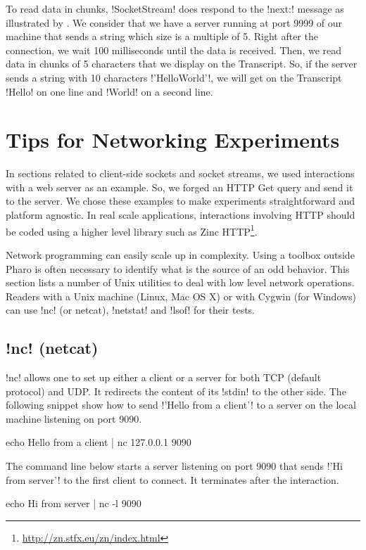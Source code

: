 \documentclass[a4paper,10pt,twoside]{book}
\begin{document}
To read data in chunks, \ct!SocketStream! does respond to the \ct!next:! message as illustrated by .
We consider that we have a server running at port 9999 of our machine that sends a string which size is a multiple of 5.
Right after the connection, we wait 100 milliseconds until the data is received.
Then, we read data in chunks of 5 characters that we display on the Transcript.
So, if the server sends a string with 10 characters \ct!'HelloWorld'!, we will get on the Transcript \ct!Hello! on one line and \ct!World! on a second line.

\section{Tips for Networking Experiments}
In sections related to client-side sockets and socket streams, we used interactions with a web server as an example. So, we forged an HTTP Get query and send it to the server.
We chose these examples to make experiments straightforward and platform agnostic.
In real scale applications, interactions involving HTTP should be coded using a higher level library such as Zinc HTTP\footnote{\url{http://zn.stfx.eu/zn/index.html}}.

Network programming can easily scale up in complexity. Using a toolbox outside Pharo is often necessary to identify what is the source of an odd behavior. This section lists a number of Unix utilities to deal with low level network operations.
Readers with a Unix machine (Linux, Mac OS X) or with Cygwin (for Windows) can use \ct!nc! (or netcat), \ct!netstat! and \ct!lsof! for their tests.

\subsection{\ct!nc! (netcat)}\label{sec:netcat}
\ct!nc! allows one to set up either a client or a server for both TCP (default protocol) and UDP.
It redirects the content of its \ct!stdin! to the other side.
The following snippet show how to send \ct!'Hello from a client'! to a server on the local machine listening on port 9090.
\begin{code}{}
echo Hello from a client | nc 127.0.0.1 9090 
\end{code}

The command line below starts a server listening on port 9090 that sends \ct!'Hi from server'! to the first client to connect.
It terminates after the interaction.
\begin{code}{}
echo Hi from server | nc -l 9090 
\end{code}
\end{document}
